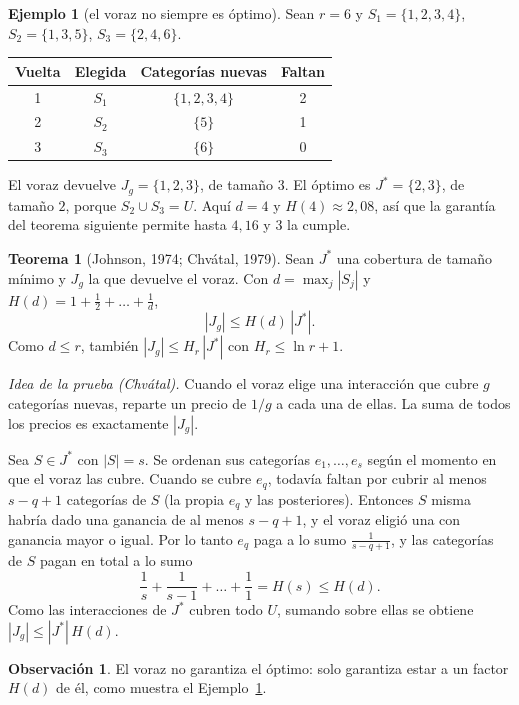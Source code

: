 \documentclass[11pt,a4paper]{article}
\theoremstyle{definition}
\newtheorem{teorema}[definicion]{Teorema}
\newtheorem{observacion}[definicion]{Observación}
\newtheorem{ejemplo}[definicion]{Ejemplo}
\begin{document}
\begin{ejemplo}[el voraz no siempre es óptimo]\label{ej:voraz}
Sean $r=6$ y $S_1=\{1,2,3,4\}$, $S_2=\{1,3,5\}$, $S_3=\{2,4,6\}$.
\begin{center}
\begin{tabular}{@{}cccc@{}}
\toprule
Vuelta & Elegida & Categorías nuevas & Faltan\\
\midrule
1 & $S_1$ & $\{1,2,3,4\}$ & 2\\
2 & $S_2$ & $\{5\}$ & 1\\
3 & $S_3$ & $\{6\}$ & 0\\
\bottomrule
\end{tabular}
\end{center}
El voraz devuelve $J_g=\{1,2,3\}$, de tamaño $3$. El óptimo es $J^*=\{2,3\}$, de tamaño $2$, porque $S_2\cup S_3=U$. Aquí $d=4$ y $H(4)\approx 2{,}08$, así que la garantía del teorema siguiente permite hasta $4{,}16$ y $3$ la cumple.
\end{ejemplo}

\begin{teorema}[Johnson, 1974; Chvátal, 1979]\label{teo:cota}
Sean $J^*$ una cobertura de tamaño mínimo y $J_g$ la que devuelve el voraz. Con $d=\max_j|S_j|$ y $H(d)=1+\tfrac12+\dots+\tfrac1d$,
\[
|J_g|\le H(d)\,|J^*| .
\]
Como $d\le r$, también $|J_g|\le H_r\,|J^*|$ con $H_r\le\ln r+1$.
\end{teorema}

\emph{Idea de la prueba (Chvátal).} Cuando el voraz elige una interacción que cubre $g$ categorías nuevas, reparte un precio de $1/g$ a cada una de ellas. La suma de todos los precios es exactamente $|J_g|$.

Sea $S\in J^*$ con $|S|=s$. Se ordenan sus categorías $e_1,\dots,e_s$ según el momento en que el voraz las cubre. Cuando se cubre $e_q$, todavía faltan por cubrir al menos $s-q+1$ categorías de $S$ (la propia $e_q$ y las posteriores). Entonces $S$ misma habría dado una ganancia de al menos $s-q+1$, y el voraz eligió una con ganancia mayor o igual. Por lo tanto $e_q$ paga a lo sumo $\frac{1}{s-q+1}$, y las categorías de $S$ pagan en total a lo sumo
\[
\frac{1}{s}+\frac{1}{s-1}+\dots+\frac{1}{1}=H(s)\le H(d).
\]
Como las interacciones de $J^*$ cubren todo $U$, sumando sobre ellas se obtiene $|J_g|\le |J^*|\,H(d)$.

\begin{observacion}
El voraz no garantiza el óptimo: solo garantiza estar a un factor $H(d)$ de él, como muestra el Ejemplo~\ref{ej:voraz}.
\end{observacion}
\end{document}

